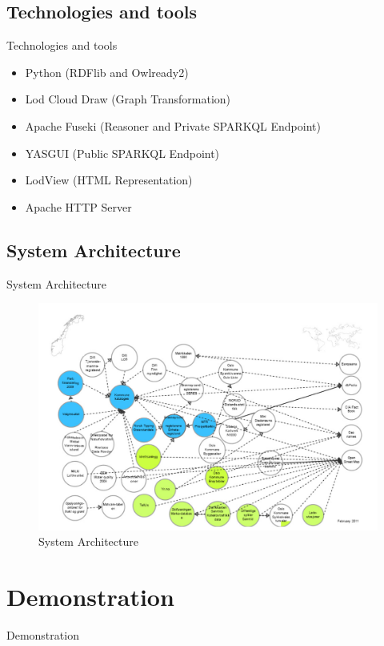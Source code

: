 \documentclass{beamer}
\begin{document}
	\subsection{Technologies and tools}
	\begin{frame}{Technologies and tools}
		\begin{itemize}
			\item Python (RDFlib and Owlready2)
			\item Lod Cloud Draw (Graph Transformation)
			\item Apache Fuseki (Reasoner and Private SPARKQL Endpoint)
			\item YASGUI (Public SPARKQL Endpoint)
			\item LodView (HTML Representation)
			\item Apache HTTP Server
		\end{itemize}
	\end{frame}

	\subsection{System Architecture}
	\begin{frame}{System Architecture}
		\begin{figure}
			\includegraphics[scale=0.19]{resources/norwegian-lod.png}
			\caption{System Architecture}
		\end{figure}
	\end{frame}

	\section{Demonstration}
	\begin{frame}{Demonstration}
	\end{frame}
\end{document}
